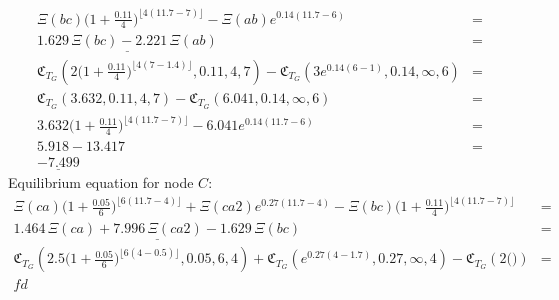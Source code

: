 \documentclass[10pt]{article}
\newcommand{\CC}{\mathfrak{C}}
\begin{document}
\begin{align*}
\Xi(bc) \Big( 1 + \frac{0.11}{4} \Big)^{ \lfloor 4(11.7 - 7) \rfloor } - \Xi(ab) e^{0.14( 11.7 - 6 ) } &= \\
\underline{ 1.629 \, \Xi(bc) - 2.221 \, \Xi(ab) } &= \\
\CC_{T_G} (2 \Big( 1 + \frac{0.11}{4} \Big)^{ \lfloor 4(7 - 1.4) \rfloor }, 0.11, 4, 7 ) - \CC_{T_G} ( 3e^{0.14 ( 6 - 1 ) }, 0.14, \infty, 6 ) &= \\
\CC_{T_G} ( 3.632, 0.11, 4, 7 ) - \CC_{T_G} ( 6.041, 0.14, \infty, 6 ) &= \\ 
3.632 \Big( 1 + \frac{0.11}{4} \Big)^{\lfloor 4(11.7 - 7) \rfloor} - 6.041e^{0.14(11.7 - 6)} &= \\
5.918 - 13.417 &= \\
\underline{-7.499}
\end{align*}
Equilibrium equation for node $C$:
\begin{align*}
\Xi(ca) \Big( 1 + \frac{0.05}{6} \Big)^{ \lfloor 6 ( 11.7 - 4) \rfloor } + \Xi(ca2) e^{ 0.27(11.7 - 4) } - \Xi(bc) \Big( 1 + \frac{0.11}{4} \Big)^{ \lfloor 4 (11.7 - 7) \rfloor } &= \\
\underline{1.464 \, \Xi(ca) +7.996 \, \Xi(ca2) - 1.629 \, \Xi(bc)} &= \\
\CC_{T_G} ( 2.5 \Big( 1 + \frac{0.05}{6} \Big)^{ \lfloor 6 ( 4 - 0.5 ) \rfloor }, 0.05, 6, 4) + \CC_{T_G} ( e^{ 0.27 (4 - 1.7) }, 0.27, \infty, 4 ) - \CC_{T_G} ( 2 \Big(  \Big) ) &= \\
fd
\end{align*}
\end{document}
